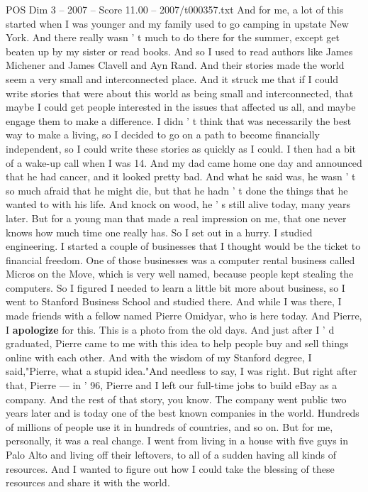 \begin{textsample}{POS Dim 3 – 2007 – Score 11.00 – 2007/t000357.txt}
And for me, a lot of this started when I was younger and my family used to go camping in upstate New York.
And there really wasn ' t much to do there for the summer, except get beaten up by my sister or read books.
And so I used to read authors like James Michener and James Clavell and Ayn Rand.
And their stories made the world seem a very small and interconnected place.
And it struck me that if I could write stories that were about this world as being small and interconnected, that maybe I could get people interested in the issues that affected us all, and maybe engage them to make a difference.
I didn ' t think that was necessarily the best way to make a living, so I decided to go on a path to become financially independent, so I could write these stories as quickly as I could.
I then had a bit of a wake-up call when I was 14.
And my dad came home one day and announced that he had cancer, and it looked pretty bad.
And what he said was, he wasn ' t so much afraid that he might die, but that he hadn ' t done the things that he wanted to with his life.
And knock on wood, he ' s still alive today, many years later.
But for a young man that made a real impression on me, that one never knows how much time one really has.
So I set out in a hurry.
I studied engineering.
I started a couple of businesses that I thought would be the ticket to financial freedom.
One of those businesses was a computer rental business called Micros on the Move, which is very well named, because people kept stealing the computers.
So I figured I needed to learn a little bit more about business, so I went to Stanford Business School and studied there.
And while I was there, I made friends with a fellow named Pierre Omidyar, who is here today.
And Pierre, I \textbf{apologize} for this.
This is a photo from the old days.
And just after I ' d graduated, Pierre came to me with this idea to help people buy and sell things online with each other.
And with the wisdom of my Stanford degree, I said,"Pierre, what a stupid idea."And needless to say, I was right.
But right after that, Pierre — in ' 96, Pierre and I left our full-time jobs to build eBay as a company.
And the rest of that story, you know.
The company went public two years later and is today one of the best known companies in the world.
Hundreds of millions of people use it in hundreds of countries, and so on.
But for me, personally, it was a real change.
I went from living in a house with five guys in Palo Alto and living off their leftovers, to all of a sudden having all kinds of resources.
And I wanted to figure out how I could take the blessing of these resources and share it with the world.

\end{textsample}
